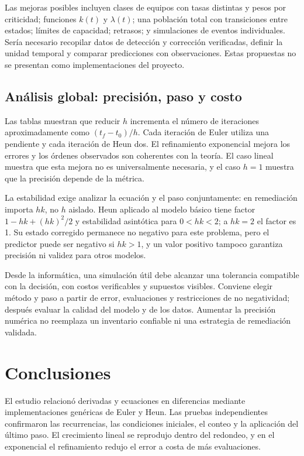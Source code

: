 \documentclass[11pt,a4paper]{article}
\begin{document}
Las mejoras posibles incluyen clases de equipos con tasas distintas y pesos por criticidad; funciones $k(t)$ y $\lambda(t)$; una población total con transiciones entre estados; límites de capacidad; retrasos; y simulaciones de eventos individuales. Sería necesario recopilar datos de detección y corrección verificadas, definir la unidad temporal y comparar predicciones con observaciones. Estas propuestas no se presentan como implementaciones del proyecto.

\subsection{Análisis global: precisión, paso y costo}
Las tablas muestran que reducir $h$ incrementa el número de iteraciones aproximadamente como $(t_f-t_0)/h$. Cada iteración de Euler utiliza una pendiente y cada iteración de Heun dos. El refinamiento exponencial mejora los errores y los órdenes observados son coherentes con la teoría. El caso lineal muestra que esta mejora no es universalmente necesaria, y el caso $h=1$ muestra que la precisión depende de la métrica.

La estabilidad exige analizar la ecuación y el paso conjuntamente: en remediación importa $hk$, no $h$ aislado. Heun aplicado al modelo básico tiene factor $1-hk+(hk)^2/2$ y estabilidad asintótica para $0<hk<2$; a $hk=2$ el factor es 1. Su estado corregido permanece no negativo para este problema, pero el predictor puede ser negativo si $hk>1$, y un valor positivo tampoco garantiza precisión ni validez para otros modelos.

Desde la informática, una simulación útil debe alcanzar una tolerancia compatible con la decisión, con costos verificables y supuestos visibles. Conviene elegir método y paso a partir de error, evaluaciones y restricciones de no negatividad; después evaluar la calidad del modelo y de los datos. Aumentar la precisión numérica no reemplaza un inventario confiable ni una estrategia de remediación validada.

\section{Conclusiones}
El estudio relacionó derivadas y ecuaciones en diferencias mediante implementaciones genéricas de Euler y Heun. Las pruebas independientes confirmaron las recurrencias, las condiciones iniciales, el conteo y la aplicación del último paso. El crecimiento lineal se reprodujo dentro del redondeo, y en el exponencial el refinamiento redujo el error a costa de más evaluaciones.
\end{document}
